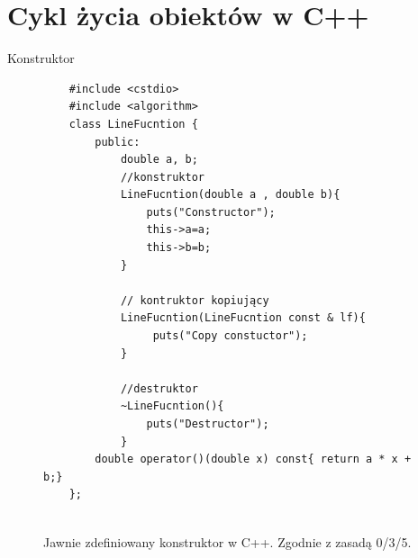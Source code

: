 \documentclass[xcolor=table]{beamer}
\begin{document}
\begin{frame}
    
\end{frame}

\section{Cykl życia obiektów w C++}








\begin{frame}[containsverbatim]{Konstruktor}
    \begin{figure}
        \centering
        \tiny
    \begin{verbatim}
    #include <cstdio>
    #include <algorithm>
    class LineFucntion {
        public:
            double a, b;
            //konstruktor
            LineFucntion(double a , double b){ 
                puts("Constructor");
                this->a=a;
                this->b=b;
            }

            // kontruktor kopiujący 
            LineFucntion(LineFucntion const & lf){
                 puts("Copy constuctor");
            }

            //destruktor
            ~LineFucntion(){
                puts("Destructor");
            }
        double operator()(double x) const{ return a * x + b;}
    };


    \end{verbatim}
        \label{fig:cpp-constructor}
        \caption{Jawnie zdefiniowany konstruktor w C++. Zgodnie z zasadą 0/3/5.}
    \end{figure}
    
\end{frame}
\end{document}
